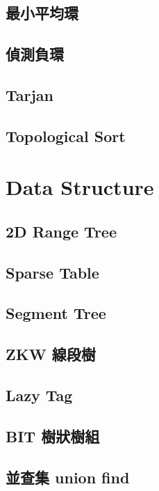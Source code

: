 \subsection{最小平均環}

\subsection{偵測負環}

\subsection{Tarjan}

\subsection{Topological Sort}


\section{Data Structure}

\subsection{2D Range Tree}

\subsection{Sparse Table}

\subsection{Segment Tree}

\subsection{ZKW 線段樹}

\subsection{Lazy Tag}

\subsection{BIT 樹狀樹組}

\subsection{並查集 union find}




